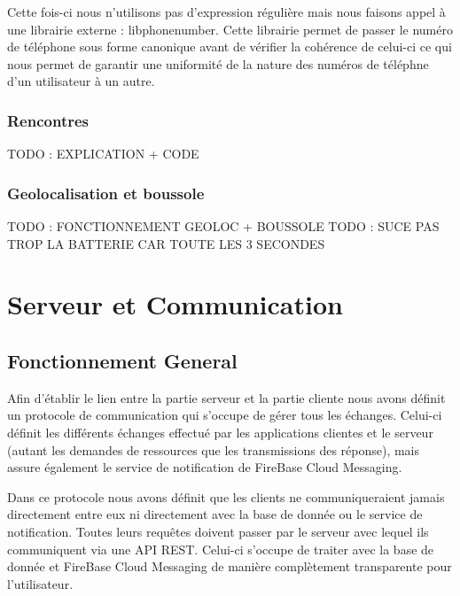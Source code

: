 \documentclass[french]{article}
\begin{document}
	Cette fois-ci nous n'utilisons pas d'expression régulière mais nous faisons appel à une librairie externe : libphonenumber.
	Cette librairie permet de passer le numéro de téléphone sous forme canonique avant de vérifier la cohérence de celui-ci ce qui nous permet de garantir une uniformité de la nature des numéros de téléphne d'un utilisateur à un autre.
	
	 
	
	\subsubsection{Rencontres}
	
	TODO : EXPLICATION + CODE
	
	\subsubsection{Geolocalisation et boussole}
	
	TODO : FONCTIONNEMENT GEOLOC + BOUSSOLE
	TODO : SUCE PAS TROP LA BATTERIE CAR TOUTE LES 3 SECONDES
	
	
	\section{Serveur et Communication}	
	\subsection{Fonctionnement General}
	
	Afin d'établir le lien entre la partie serveur et la partie cliente nous avons définit un protocole de communication qui s'occupe de gérer tous les échanges. Celui-ci définit les différents échanges effectué par les applications clientes et le serveur (autant les demandes de ressources que les transmissions des réponse), mais assure également le service de notification de FireBase Cloud Messaging. 
	
	\medbreak
	
	Dans ce protocole nous avons définit que les clients ne communiqueraient jamais directement entre eux ni directement avec la base de donnée ou le service de notification. Toutes leurs requêtes doivent passer par le serveur avec lequel ils communiquent via une API REST. Celui-ci s'occupe de traiter avec la base de donnée et FireBase Cloud Messaging de manière complètement transparente pour l'utilisateur.
	
\end{document}
